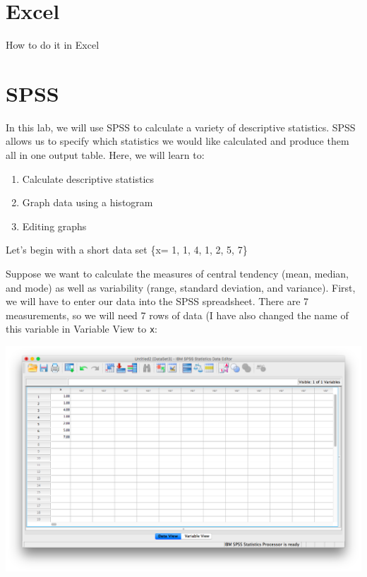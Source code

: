 \documentclass[
]{book}
\providecommand{\tightlist}{%
  \setlength{\itemsep}{0pt}\setlength{\parskip}{0pt}}
\begin{document}
\hypertarget{excel-2}{%
\section{Excel}\label{excel-2}}

How to do it in Excel

\hypertarget{spss-2}{%
\section{SPSS}\label{spss-2}}

In this lab, we will use SPSS to calculate a variety of descriptive statistics. SPSS allows us to specify which statistics we would like calculated and produce them all in one output table. Here, we will learn to:

\begin{enumerate}
\def\labelenumi{\arabic{enumi}.}
\tightlist
\item
  Calculate descriptive statistics
\item
  Graph data using a histogram
\item
  Editing graphs
\end{enumerate}

Let's begin with a short data set \{x= 1, 1, 4, 1, 2, 5, 7\}

Suppose we want to calculate the measures of central tendency (mean, median, and mode) as well as variability (range, standard deviation, and variance). First, we will have to enter our data into the SPSS spreadsheet. There are 7 measurements, so we will need 7 rows of data (I have also changed the name of this variable in Variable View to \texttt{x}:

\includegraphics{img/2.4.11.png}
\end{document}
